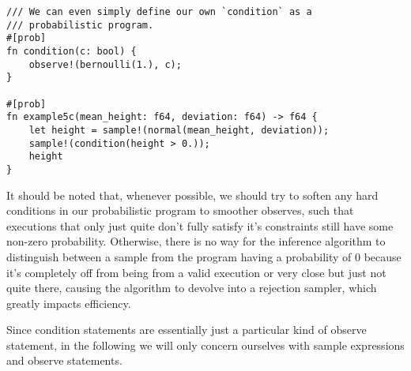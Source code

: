 \begin{minipage}{\linewidth}
\begin{lstlisting}
/// We can even simply define our own `condition` as a
/// probabilistic program.
#[prob]
fn condition(c: bool) {
    observe!(bernoulli(1.), c);
}

#[prob]
fn example5c(mean_height: f64, deviation: f64) -> f64 {
    let height = sample!(normal(mean_height, deviation));
    sample!(condition(height > 0.));
    height
}
\end{lstlisting}
\end{minipage}

It should be noted that, whenever possible, we should try to soften any hard conditions in our probabilistic program to smoother observes, such that executions that only just quite don't fully satisfy it's constraints still have some non-zero probability. Otherwise, there is no way for the inference algorithm to distinguish between a sample from the program having a probability of $0$ because it's completely off from being from a valid execution or very close but just not quite there, causing the algorithm to devolve into a rejection sampler, which greatly impacts efficiency.

Since condition statements are essentially just a particular kind of observe statement, in the following we will only concern ourselves with sample expressions and observe statements.
